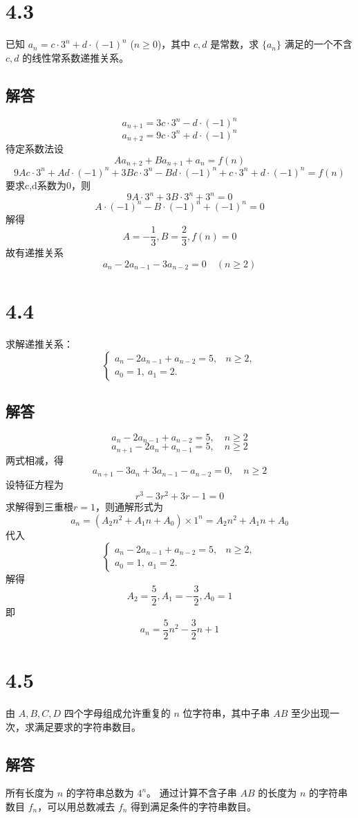 \documentclass[12pt]{article}
\begin{document}
\section*{4.3}
已知 \( a_n = c \cdot 3^n + d \cdot (-1)^n \) (\( n \geq 0 \))，其中 \( c, d \) 是常数，求 \(\{a_n\}\) 满足的一个不含 \( c, d \) 的线性常系数递推关系。
\subsection*{解答}
\[a_{n+1} = 3 c \cdot 3^n - d \cdot (-1)^n\]
\[a_{n+2} = 9 c \cdot 3^n + d \cdot (-1)^n\]
待定系数法设
\[Aa_{n+2} + Ba_{n+1}+ a_n=f(n)\]
\[9Ac \cdot 3^n+Ad \cdot (-1)^n+3Bc \cdot 3^n-Bd\cdot (-1)^n+c \cdot 3^n+d \cdot (-1)^n=f(n)\]
要求c,d系数为0，则
\[9A\cdot 3^n+3B\cdot 3^n+3^n=0\]
\[A\cdot (-1)^n-B\cdot (-1)^n+(-1)^n=0\]
解得
\[A=-\frac{1}{3}, B=\frac{2}{3}, f(n)=0\]
故有递推关系
\[a_n-2a_{n-1}-3a_{n-2}=0 \quad (n \geq 2)\]

\section*{4.4}
求解递推关系：
\[
\begin{cases}
    a_n - 2a_{n-1} + a_{n-2} = 5, & n \geq 2, \\
    a_0 = 1, \ a_1 = 2. &
\end{cases}
\]
\subsection*{解答}
\[a_n - 2a_{n-1} + a_{n-2} = 5, \quad n \geq 2\]
\[a_{n+1} - 2a_{n} + a_{n-1} = 5, \quad n \geq 2\]
两式相减，得
\[a_{n+1}- 3a_{n} + 3a_{n-1} - a_{n-2} = 0, \quad n \geq 2\]
设特征方程为
\[r^3 - 3r^2 + 3r - 1= 0\]
求解得到三重根$r=1$，则通解形式为
\[a_n=(A_2n^2+A_1n+A_0)\times1^n=A_2n^2+A_1n+A_0\]
代入\[
\begin{cases}
    a_n - 2a_{n-1} + a_{n-2} = 5, & n \geq 2, \\
    a_0 = 1, \ a_1 = 2. &
\end{cases}
\]
解得
\[A_2=\frac{5}{2}, A_1=-\frac{3}{2}, A_0=1\]
即\[a_n=\frac{5}{2}n^2-\frac{3}{2}n+1\]

\section*{4.5}
由 \( A, B, C, D \) 四个字母组成允许重复的 \( n \) 位字符串，其中子串 \( AB \) 至少出现一次，求满足要求的字符串数目。
\subsection*{解答}
所有长度为 \( n \) 的字符串总数为 \( 4^n \)。
通过计算不含子串 \( AB \) 的长度为 \( n \) 的字符串数目 \( f_n \)，可以用总数减去 \( f_n \) 得到满足条件的字符串数目。
\end{document}
